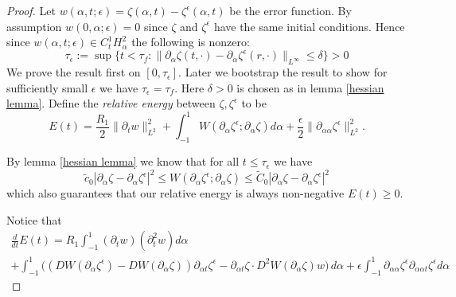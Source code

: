 \documentclass{article}[12pt]
\theoremstyle{Theorem}
\begin{document}
\begin{proof}
      Let $w(\alpha, t;\epsilon) =\zeta(\alpha, t) - \zeta^\epsilon(\alpha, t)$ be the error function. By assumption $w(0,\alpha;\epsilon) = 0$ since $\zeta$ and $\zeta^\epsilon$ have the same initial conditions. Hence since $w(\alpha, t;\epsilon) \in C^1_tH^2_\alpha$ the following is nonzero: 
      \begin{equation}
          \tau_\epsilon :=\sup\{t < \tau_f :\|\partial_\alpha\zeta(t,\cdot) -\partial_\alpha\zeta^\epsilon(r,\cdot)\|_{L^\infty} \leq\delta\} >0
      \end{equation}
      We prove the result first on $[0,\tau_\epsilon]$. Later we bootstrap the result to show for sufficiently small $\epsilon$ we have $\tau_\epsilon = \tau_f$. Here $\delta >0$ is chosen as in lemma \ref{hessian lemma}. 
      Define the \textit{relative energy} between $\zeta,\zeta^\epsilon$ to be 
    \begin{equation}
       E(t) = \frac{R_1}{2}\|\partial_tw\|^2_{L^2}
            +\int_{-1}^1W(\partial_\alpha\zeta^\epsilon;\partial_\alpha\zeta)d\alpha
            + \frac{\epsilon}{2}\|\partial_{\alpha\alpha}\zeta^\epsilon\|^2_{L^2}.
    \end{equation} 
    
    By lemma \ref{hessian lemma} we know that for all $t \leq \tau_\epsilon$ we have
    \begin{equation}
         \tilde{c}_0|\partial_\alpha\zeta -\partial_\alpha\zeta^\epsilon|^2\leq W(\partial_\alpha\zeta^\epsilon;\partial_\alpha\zeta) \leq \tilde{C}_0|\partial_\alpha\zeta -\partial_\alpha\zeta^\epsilon|^2
    \end{equation} which also guarantees that our relative energy is always non-negative $E(t)\geq 0$. 
    \newline
    
    Notice that 
    \begin{multline}
        \frac{d}{dt}E(t) = R_1\int_{-1}^1(\partial_tw)(\partial_t^2w)d\alpha  \\ + \int_{-1}^1\bigg((DW(\partial_\alpha\zeta^\epsilon) -DW(\partial_\alpha\zeta))\partial_{\alpha t}\zeta^\epsilon - \partial_{\alpha t}\zeta \cdot D^2W(\partial_\alpha\zeta)w\bigg)\, d\alpha  + \epsilon\int_{-1}^1\partial_{\alpha\alpha}\zeta^\epsilon\partial_{\alpha\alpha t}\zeta^\epsilon  d\alpha
        \label{time derivative energy step 1 equation}
    \end{multline}


\end{proof}
\end{document}
